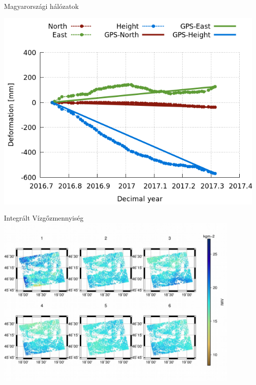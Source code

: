 \documentclass{beamer}
\begin{document}
\begin{frame}{Magyarországi hálózatok}
\begin{minipage}[c]{0.975\textwidth}
\begin{minipage}[c]{0.475\textwidth}
        \includegraphics[width=\textwidth]{IB4-IB1_kalman.png}
    \end{minipage}
    \begin{minipage}[c]{0.475\textwidth}
        
    \end{minipage}
\end{minipage}
\end{frame}

\begin{frame}{}

\end{frame}


\begin{frame}{Integrált Vízgőzmennyiség}
\includegraphics[width=0.9\textwidth]{iwv.png}
\end{frame}
\end{document}
